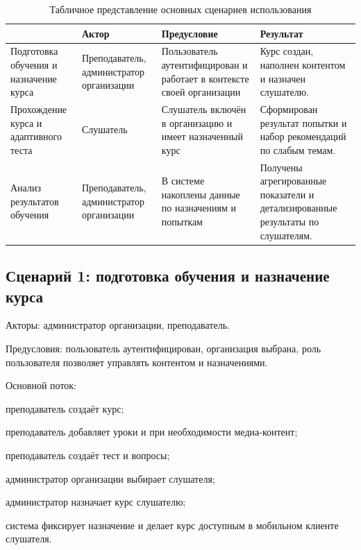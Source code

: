 \begin{table}[H]
\centering
\caption{Табличное представление основных сценариев использования}
\label{tab:design-scenarios}
{\fontsize{12pt}{12pt}\selectfont
\setlength{\tabcolsep}{5pt}
\renewcommand{\arraystretch}{1.15}
\begin{tabularx}{\textwidth}{|>{\RaggedRight\arraybackslash}p{28mm}|>{\RaggedRight\arraybackslash}p{34mm}|>{\RaggedRight\arraybackslash}p{28mm}|>{\RaggedRight\arraybackslash}X|}
\hline
{\centering\arraybackslash\textbf{Сценарий}} & {\centering\arraybackslash\textbf{Актор}} & {\centering\arraybackslash\textbf{Предусловие}} & {\centering\arraybackslash\textbf{Результат}} \\
\hline
Подготовка обучения и назначение курса & Преподаватель, администратор организации & Пользователь аутентифицирован и работает в контексте своей организации & Курс создан, наполнен контентом и назначен слушателю. \\
\hline
Прохождение курса и адаптивного теста & Слушатель & Слушатель включён в организацию и имеет назначенный курс & Сформирован результат попытки и набор рекомендаций по слабым темам. \\
\hline
Анализ результатов обучения & Преподаватель, администратор организации & В системе накоплены данные по назначениям и попыткам & Получены агрегированные показатели и детализированные результаты по слушателям. \\
\hline
\end{tabularx}
}
\end{table}

\subsection{Сценарий 1: подготовка обучения и назначение курса}

Акторы: администратор организации, преподаватель.

Предусловия: пользователь аутентифицирован, организация выбрана, роль пользователя позволяет управлять контентом и назначениями.

Основной поток:
\begin{parenlist}
  \item преподаватель создаёт курс;
  \item преподаватель добавляет уроки и при необходимости медиа-контент;
  \item преподаватель создаёт тест и вопросы;
  \item администратор организации выбирает слушателя;
  \item администратор назначает курс слушателю;
  \item система фиксирует назначение и делает курс доступным в мобильном клиенте слушателя.
\end{parenlist}

